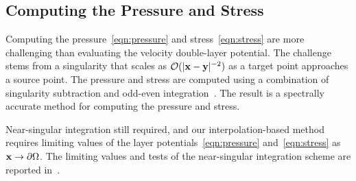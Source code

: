 \documentclass[preprint, 10pt]{elsarticle}
\begin{document}
\subsection{Computing the Pressure and Stress}
\label{sec:pressure_stress}
Computing the pressure~\eqref{eqn:pressure} and
stress~\eqref{eqn:stress} are more challenging than evaluating the
velocity double-layer potential.  The challenge stems from a singularity
that scales as $\mathcal{O}(|{\mathbf{x}} - {\mathbf{y}}|^{-2})$ as a target point
approaches a source point.  The pressure and stress are computed using a
combination of singularity subtraction and odd-even
integration~\cite{sid-isr1988}.  The result is a spectrally accurate
method for computing the pressure and stress.

Near-singular integration still required, and our interpolation-based
method requires limiting values of the layer
potentials~\eqref{eqn:pressure} and~\eqref{eqn:stress} as ${\mathbf{x}}
\rightarrow {\partial}\Omega$.  The limiting values and tests of the
near-singular integration scheme are reported in~\cite{Quaife2014}.


\end{document}
